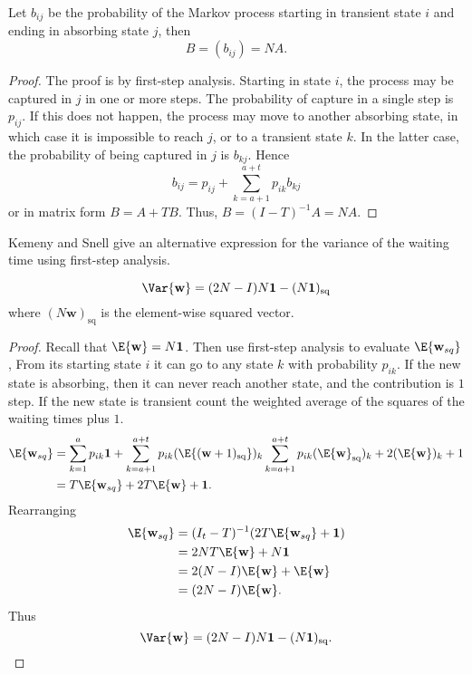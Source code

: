 \documentclass[12pt]{article}
\begin{document}
\begin{theorem}
  Let \( b_{ij} \) be the probability of the Markov process starting
  in transient state \( i \) and ending in absorbing state $j$, then
  \[
        B = ( b_{ij} ) = NA.
  \]
\end{theorem}

\begin{proof}
   The proof is by first-step analysis.  Starting in state \( i \),
   the process may be captured in \( j \) in one or more steps.  The
   probability of capture in a single step is \( p_{ij} \).  If this
   does not happen, the process may move to another absorbing state,
   in which case it is impossible to reach \( j \), or to a transient
   state \( k \).  In the latter case, the probability of being
   captured in \( j \) is \( b_{kj} \).  Hence
   \[
        b_{ij} = p_{ij} + \sum\limits_{k =a+1}^{a+t} p_{ik} b_{kj}
   \]
   or in matrix form \( B = A + TB\). Thus, \( B = (I-T)^{-1} A = NA \). 
\end{proof}

Kemeny and Snell \cite[page 51]{kemeny60} give an alternative expression for the variance of
the waiting time using first-step analysis.

\begin{theorem}
\[
     \Var{\mathbf{w}} = (2N - I)N\mathbf{1} -
     (N\mathbf{1})_{\text{sq}}
\]
where \( (N\mathbf{w})_{\text{sq}} \) is the element-wise squared vector.
\end{theorem}

\begin{proof}
  Recall that \( \E{\mathbf{w}} = N \mathbf{1} \).
  Then use first-step analysis to evaluate \( \E{\mathbf{w}_{sq}} \),
  From its starting state \( i \) it can go to any state \( k \) with
  probability $p_{ik}$.  If the new state is absorbing, then it can
  never reach another state, and the contribution is \( 1 \) step.  If
  the new state is transient count the weighted average of the squares
  of the waiting times plus \(1 \).
\begin{align*}
     \E{\mathbf{w}_{sq}} &=
     \sum\limits_{k=1}^{a} p_{ik} \mathbf{1} +
     \sum\limits_{k=a+1}^{a+t} p_{ik} (\E{ (\mathbf{w}+1)_{\text{sq}} })_k
     \sum\limits_{k=a+1}^{a+t} p_{ik} (\E{ \mathbf{w}}_{\text{sq}})_k + 2
       (\E{ \mathbf{w}})_k + 1 \\
     &= T \E{\mathbf{w}_{sq}} + 2 T\E{\mathbf{w}} + \mathbf{1}.
\end{align*}
   Rearranging
\begin{align*}
     \E{\mathbf{w}_{sq}} &= (I_t - T)^{-1} (2 T\E{\mathbf{w}_{sq}} +
                           \mathbf{1}) \\
                        &= 2NT \E{\mathbf{w}} + N \mathbf{1} \\
                        &= 2(N-I) \E{\mathbf{w}} + \E{\mathbf{w}} \\
                        &= (2N-I) \E{\mathbf{w}}.
\end{align*}
Thus
\[
  \Var{\mathbf{w}} = (2N - I)N\mathbf{1} -
     (N\mathbf{1})_{\text{sq}}.
\]
\end{proof}
\end{document}

